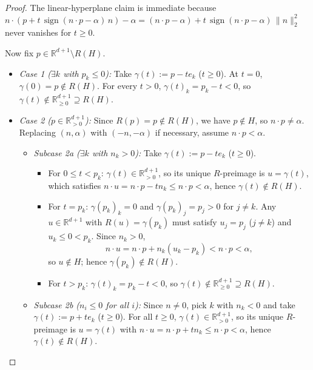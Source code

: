 \documentclass[11pt]{article}
\theoremstyle{plain}
\theoremstyle{definition}
\theoremstyle{remark}
\DeclareMathOperator{\sign}{sign}
\begin{document}
\begin{proof}
The linear-hyperplane claim is immediate because $n \cdot (p + t\,\sign(n \cdot p - \alpha)\,n) - \alpha = (n \cdot p - \alpha) + t\,\sign(n \cdot p - \alpha)\,\|n\|_2^2$ never vanishes for $t \ge 0$.

Now fix $p \in \mathbb{R}^{d+1} \setminus R(H)$.
\begin{itemize}[leftmargin=2em]
\item \emph{Case 1 ($\exists k$ with $p_k \le 0$):} Take $\gamma(t) := p - t e_k$ ($t \ge 0$). At $t = 0$, $\gamma(0) = p \notin R(H)$. For every $t > 0$, $\gamma(t)_k = p_k - t < 0$, so $\gamma(t) \notin \mathbb{R}_{\ge 0}^{d+1} \supseteq R(H)$.
\item \emph{Case 2 ($p \in \mathbb{R}_{>0}^{d+1}$):} Since $R(p) = p \notin R(H)$, we have $p \notin H$, so $n \cdot p \neq \alpha$. Replacing $(n, \alpha)$ with $(-n, -\alpha)$ if necessary, assume $n \cdot p < \alpha$.
  \begin{itemize}[leftmargin=1.5em]
  \item \emph{Subcase 2a ($\exists k$ with $n_k > 0$):} Take $\gamma(t) := p - t e_k$ ($t \ge 0$).
    \begin{itemize}[leftmargin=1.2em]
    \item For $0 \le t < p_k$: $\gamma(t) \in \mathbb{R}_{>0}^{d+1}$, so its unique $R$-preimage is $u = \gamma(t)$, which satisfies $n \cdot u = n \cdot p - t n_k \le n \cdot p < \alpha$, hence $\gamma(t) \notin R(H)$.
    \item For $t = p_k$: $\gamma(p_k)_k = 0$ and $\gamma(p_k)_j = p_j > 0$ for $j \neq k$. Any $u \in \mathbb{R}^{d+1}$ with $R(u) = \gamma(p_k)$ must satisfy $u_j = p_j$ ($j \neq k$) and $u_k \le 0 < p_k$. Since $n_k > 0$,
    \[
    n \cdot u = n \cdot p + n_k (u_k - p_k) < n \cdot p < \alpha,
    \]
    so $u \notin H$; hence $\gamma(p_k) \notin R(H)$.
    \item For $t > p_k$: $\gamma(t)_k = p_k - t < 0$, so $\gamma(t) \notin \mathbb{R}_{\ge 0}^{d+1} \supseteq R(H)$.
    \end{itemize}
  \item \emph{Subcase 2b ($n_i \le 0$ for all $i$):} Since $n \neq 0$, pick $k$ with $n_k < 0$ and take $\gamma(t) := p + t e_k$ ($t \ge 0$). For all $t \ge 0$, $\gamma(t) \in \mathbb{R}_{>0}^{d+1}$, so its unique $R$-preimage is $u = \gamma(t)$ with $n \cdot u = n \cdot p + t n_k \le n \cdot p < \alpha$, hence $\gamma(t) \notin R(H)$. \qedhere
  \end{itemize}
\end{itemize}
\end{proof}
\end{document}
